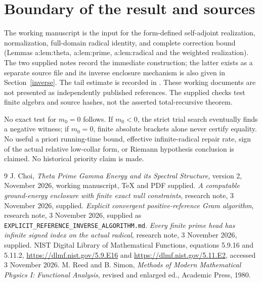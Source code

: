 \documentclass[11pt]{article}
\begin{document}
\section{Boundary of the result and sources}\label{scope}
The working manuscript \cite{source} is the input for the form-defined self-adjoint realization, normalization, full-domain radical identity, and complete correction bound (Lemmas a:lem:theta, a:lem:prime, a:lem:radical and the weighted realization). The two supplied notes \cite{computablenote,inversefile} record the immediate construction; the latter exists as a separate source file and its inverse enclosure mechanism is also given in Section~\ref{inverse}. The tail estimate is recorded in \cite{indexnote}. These working documents are not presented as independently published references. The supplied checks test finite algebra and source hashes, not the asserted total-recursive theorem.

No exact test for $m_0=0$ follows. If $m_0<0$, the strict trial search eventually finds a negative witness; if $m_0=0$, finite absolute brackets alone never certify equality. No useful a priori running-time bound, effective infinite-radical repair rate, sign of the actual relative low-collar form, or Riemann hypothesis conclusion is claimed. No historical priority claim is made.

\begin{thebibliography}{9}
 J. Choi, \emph{Theta Prime Gamma Energy and its Spectral Structure}, version 2, November 2026, working manuscript, TeX and PDF supplied.
 \emph{A computable ground-energy enclosure with finite exact null constraints}, research note, 3 November 2026, supplied.
 \emph{Explicit convergent positive-reference Gram algorithm}, research note, 3 November 2026, supplied as \texttt{EXPLICIT\_REFERENCE\_INVERSE\_ALGORITHM.md}.
 \emph{Every finite prime head has infinite signed index on the actual radical}, research note, 3 November 2026, supplied.
 NIST Digital Library of Mathematical Functions, equations 5.9.16 and 5.11.2, \url{https://dlmf.nist.gov/5.9.E16} and \url{https://dlmf.nist.gov/5.11.E2}, accessed 3 November 2026.
 M. Reed and B. Simon, \emph{Methods of Modern Mathematical Physics I: Functional Analysis}, revised and enlarged ed., Academic Press, 1980.
\end{thebibliography}
\end{document}
